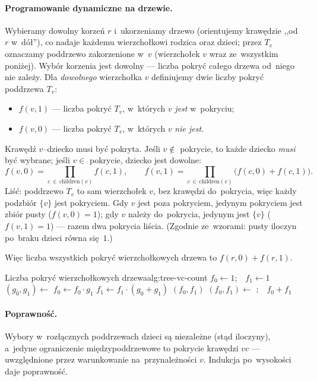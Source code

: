 \paragraph{Programowanie dynamiczne na drzewie.}
Wybieramy dowolny korzeń $r$ i~ukorzeniamy drzewo (orientujemy krawędzie
,,od~$r$ w~dół''), co nadaje każdemu wierzchołkowi rodzica oraz dzieci; przez
$T_v$ oznaczamy poddrzewo zakorzenione w~$v$ (wierzchołek $v$ wraz ze~wszystkim
poniżej). Wybór korzenia jest dowolny --- liczba pokryć całego drzewa od~niego
nie zależy. Dla \emph{dowolnego} wierzchołka $v$ 
definiujemy dwie liczby pokryć poddrzewa $T_v$:
\begin{itemize}[nosep]
	\item $f(v,1)$ --- liczba pokryć $T_v$, w~których $v$ \emph{jest} w~pokryciu;
	\item $f(v,0)$ --- liczba pokryć $T_v$, w~których $v$ \emph{nie jest}.
\end{itemize}
Krawędź $v$--dziecko musi być pokryta. Jeśli $v\notin$ pokrycie, to każde
dziecko \emph{musi} być wybrane; jeśli $v\in$ pokrycie, dziecko jest dowolne:
\[
	f(v,0)=\prod_{c\,\in\,\mathrm{children}(v)} f(c,1),
	\qquad
	f(v,1)=\prod_{c\,\in\,\mathrm{children}(v)} \big(f(c,0)+f(c,1)\big).
\]
Liść: poddrzewo $T_v$ to sam wierzchołek $v$, bez krawędzi do~pokrycia, więc
każdy podzbiór $\{v\}$ jest pokryciem. Gdy $v$ jest poza pokryciem, jedynym
pokryciem jest zbiór pusty ($f(v,0)=1$); gdy $v$ należy do~pokrycia, jedynym
jest $\{v\}$ ($f(v,1)=1$) --- razem dwa pokrycia liścia.
(Zgodnie ze~wzorami: pusty iloczyn po~braku dzieci równa się~$1$.) 

Więc liczba wszystkich pokryć wierzchołkowych drzewa to $f(r,0)+f(r,1)$.

\begin{alg}{Liczba pokryć wierzchołkowych drzewa}{alg:tree-vc-count}
	\State $f_0\gets 1$;\ \ $f_1\gets 1$
	\State $(g_0,g_1)\gets$ 
	\State $f_0\gets f_0\cdot g_1$
	\State $f_1\gets f_1\cdot(g_0+g_1)$
	\EndFor
	\State \Return $(f_0,f_1)$
	\EndFunction
	\Statex
	\State $(f_0,f_1)\gets$ ;\ \ \Return $f_0+f_1$
\end{alg}

\paragraph{Poprawność.}
Wybory w~rozłącznych poddrzewach dzieci są niezależne (stąd iloczyny), a~jedyne
ograniczenie międzypoddrzewowe to pokrycie krawędzi $v c$ --- uwzględnione przez
warunkowanie na~przynależności $v$. Indukcja po~wysokości daje poprawność.

